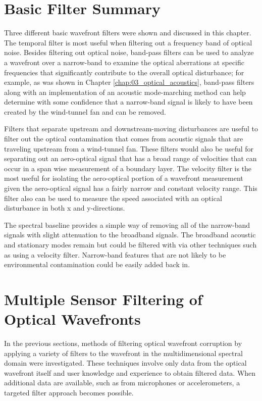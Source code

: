 \section{Basic Filter Summary}
Three different basic wavefront filters were shown and discussed in this chapter.
The temporal filter is most useful when filtering out a frequency band of optical noise.
Besides filtering out optical noise, band-pass filters can be used to analyze a wavefront over a narrow-band to examine the optical aberrations at specific frequencies that significantly contribute to the overall optical disturbance; for example, as was shown in Chapter \ref{chap:03_optical_acoustics}, band-pass filters along with an implementation of an acoustic mode-marching method can help determine with some confidence that a narrow-band signal is likely to have been created by the wind-tunnel fan and can be removed.

Filters that separate upstream and downstream-moving disturbances are useful to filter out the optical contamination that comes from acoustic signals that are traveling upstream from a wind-tunnel fan.
These filters would also be useful for separating out an aero-optical signal that has a broad range of velocities that can occur in a span wise measurement of a boundary layer.
The velocity filter is the most useful for isolating the aero-optical portion of a wavefront measurement given the aero-optical signal has a fairly narrow and constant velocity range.
This filter also can be used to measure the speed associated with an optical disturbance in both x and y-directions.

The spectral baseline provides a simple way of removing all of the narrow-band signals with slight attenuation to the broadband signals.
The broadband acoustic and stationary modes remain but could be filtered with via other techniques such as using a velocity filter.
Narrow-band features that are not likely to be environmental contamination could be easily added back in.

\section{Multiple Sensor Filtering of Optical Wavefronts}
In the previous sections, methods of filtering optical wavefront corruption by applying a variety of filters to the wavefront in the multidimensional spectral domain were investigated.
These techniques involve only data from the optical wavefront itself and user knowledge and experience to obtain filtered data.
When additional data are available, such as from microphones or accelerometers, a targeted filter approach becomes possible.

